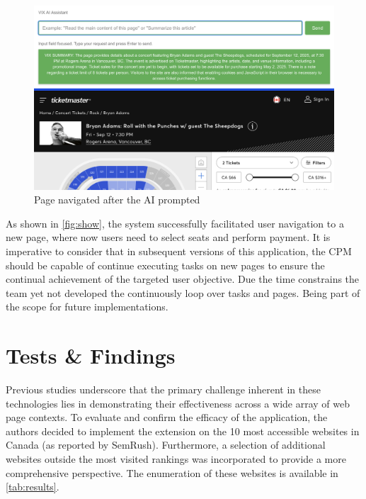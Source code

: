 \documentclass[conference]{IEEEtran}
\begin{document}
\begin{figure}[h]
\centering
\includegraphics[width=\columnwidth]{images/4.png}
\caption{Page navigated after the AI prompted}
\label{fig:show}
\end{figure}

As shown in \autoref{fig:show}, the system successfully facilitated user navigation to a new page, where now users need to select seats and perform payment. It is imperative to consider that in subsequent versions of this application, the CPM should be capable of continue executing tasks on new pages to ensure the continual achievement of the targeted user objective. Due the time constrains the team yet not developed the continuously loop over tasks and pages. Being part of the scope for future implementations.


\section{Tests \& Findings}\label{test}

Previous studies underscore that the primary challenge inherent in these technologies lies in demonstrating their effectiveness across a wide array of web page contexts. \cite{prakash2024, he2024webvoyager} To evaluate and confirm the efficacy of the application, the authors decided to implement the extension on the 10 most accessible websites in Canada (as reported by SemRush).\cite{semrumsh} Furthermore, a selection of additional websites outside the most visited rankings was incorporated to provide a more comprehensive perspective. The enumeration of these websites is available in \autoref{tab:results}.
\end{document}
